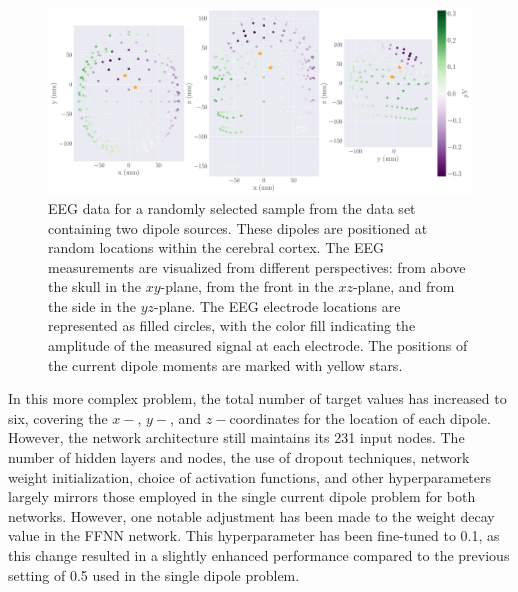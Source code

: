 \documentclass[a4paper, UKenglish, 11pt]{uiomaster}
\begin{document}
\begin{figure}[!htb]
\centering
\includegraphics[width=\linewidth]{figures/purple_green/dipoles_w_amplitudes_eeg_field_2_20.pdf}
\caption{EEG data for a randomly selected sample from the data set containing two dipole sources. These dipoles are positioned at random locations within the cerebral cortex. The EEG measurements are visualized from different perspectives: from above the skull in the $xy$-plane, from the front in the $xz$-plane, and from the side in the $yz$-plane. The EEG electrode locations are represented as filled circles, with the color fill indicating the amplitude of the measured signal at each electrode. The positions of the current dipole moments are marked with yellow stars.}
\label{fig:multiple_dipoles_data}
\end{figure}

\FloatBarrier

In this more complex problem, the total number of target values has increased to six, covering the $x-$, $y-$, and $z-$coordinates for the location of each dipole. However, the network architecture still maintains its 231 input nodes. The number of hidden layers and nodes, the use of dropout techniques, network weight initialization, choice of activation functions, and other hyperparameters largely mirrors those employed in the single current dipole problem for both networks. However, one notable adjustment has been made to the weight decay value in the FFNN network. This hyperparameter has been fine-tuned to 0.1, as this change resulted in a slightly enhanced performance compared to the previous setting of 0.5 used in the single dipole problem.
\end{document}
